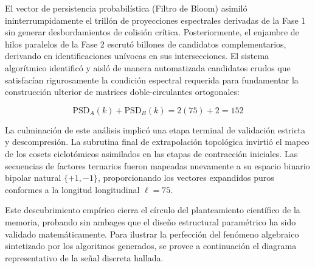 \documentclass[12pt,a4paper]{tfg_domingo}
\begin{document}
El vector de persistencia probabilística (Filtro de Bloom) asimiló
ininterrumpidamente el trillón de proyecciones espectrales derivadas
de la Fase 1 sin generar desbordamientos de colisión
crítica. Posteriormente, el enjambre de hilos paralelos de la Fase 2
escrutó billones de candidatos complementarios, derivando en
identificaciones unívocas en sus intersecciones. El sistema
algorítmico identificó y aisló de manera automatizada candidatos
crudos que satisfacían rigurosamente la condición espectral requerida
para fundamentar la construcción ulterior de matrices
doble-circulantes ortogonales: 

\[ \text{PSD}_A(k) + \text{PSD}_B(k) = 2(75) + 2 = 152 \]

La culminación de este análisis implicó una etapa terminal de
validación estricta y descompresión. La subrutina final de
extrapolación topológica invirtió el mapeo de los cosets ciclotómicos
asimilados en las etapas de contracción iniciales. Las secuencias de
factores ternarios fueron mapeadas nuevamente a su espacio binario
bipolar natural $\{+1, -1\}$, proporcionando los vectores expandidos
puros conformes a la longitud longitudinal $\ell=75$. 

\begin{center}
\end{center}

Este descubrimiento empírico cierra el círculo del planteamiento científico de la memoria, probando sin ambages que el diseño estructural paramétrico ha sido validado matemáticamente. Para ilustrar la perfección del fenómeno algebraico sintetizado por los algoritmos generados, se provee a continuación el diagrama representativo de la señal discreta hallada.
\end{document}
